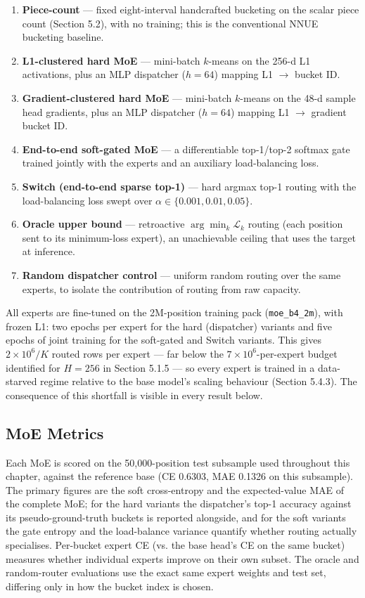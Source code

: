 \begin{enumerate}
  \item \textbf{Piece-count} --- fixed eight-interval handcrafted bucketing on the scalar piece count (Section 5.2), with no training; this is the conventional NNUE bucketing baseline.
  \item \textbf{L1-clustered hard MoE} --- mini-batch $k$-means on the 256-d L1 activations, plus an MLP dispatcher ($h{=}64$) mapping L1 $\to$ bucket ID.
  \item \textbf{Gradient-clustered hard MoE} --- mini-batch $k$-means on the 48-d sample head gradients, plus an MLP dispatcher ($h{=}64$) mapping L1 $\to$ gradient bucket ID.
  \item \textbf{End-to-end soft-gated MoE} --- a differentiable top-1/top-2 softmax gate trained jointly with the experts and an auxiliary load-balancing loss.
  \item \textbf{Switch (end-to-end sparse top-1)} --- hard argmax top-1 routing with the load-balancing loss swept over $\alpha \in \{0.001, 0.01, 0.05\}$.
  \item \textbf{Oracle upper bound} --- retroactive $\arg\min_k \mathcal{L}_k$ routing (each position sent to its minimum-loss expert), an unachievable ceiling that uses the target at inference.
  \item \textbf{Random dispatcher control} --- uniform random routing over the same experts, to isolate the contribution of routing from raw capacity.
\end{enumerate}


All experts are fine-tuned on the 2M-position training pack (\texttt{moe\_b4\_2m}), with frozen L1: two epochs per expert for the hard (dispatcher) variants and five epochs of joint training for the soft-gated and Switch variants. This gives $2\times10^6/K$ routed rows per expert --- far below the $7\times10^6$-per-expert budget identified for $H{=}256$ in Section 5.1.5 --- so every expert is trained in a data-starved regime relative to the base model's scaling behaviour (Section 5.4.3). The consequence of this shortfall is visible in every result below.

\subsection{MoE Metrics}

Each MoE is scored on the 50,000-position test subsample used throughout this chapter, against the reference base (CE 0.6303, MAE 0.1326 on this subsample). The primary figures are the soft cross-entropy and the expected-value MAE of the complete MoE; for the hard variants the dispatcher's top-1 accuracy against its pseudo-ground-truth buckets is reported alongside, and for the soft variants the gate entropy and the load-balance variance quantify whether routing actually specialises. Per-bucket expert CE (vs. the base head's CE on the same bucket) measures whether individual experts improve on their own subset. The oracle and random-router evaluations use the exact same expert weights and test set, differing only in how the bucket index is chosen.

